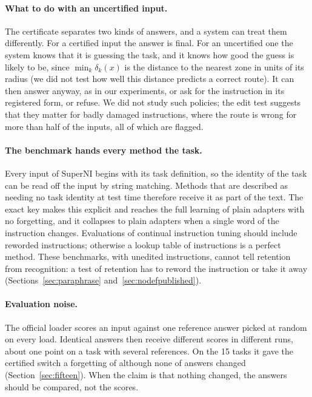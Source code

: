 \paragraph{What to do with an uncertified input.} The certificate separates two kinds of answers,
and a system can treat them differently. For a certified input the answer is final. For an
uncertified one the system knows that it is guessing the task, and it knows how good the guess is
likely to be, since $\min_k \delta_k(x)$ is the distance to the nearest zone in units of its radius (we did not test how well this distance predicts a correct route).
It can then answer anyway, as in our experiments, or ask for the instruction in its registered
form, or refuse. We did not study such policies; the edit test suggests that they matter for badly
damaged instructions, where the route is wrong for more than half of the inputs, all of which are
flagged.

\paragraph{The benchmark hands every method the task.} Every input of SuperNI begins with its task
definition, so the identity of the task can be read off the input by string matching. Methods that
are described as needing no task identity at test time therefore receive it as part of the text.
The exact key makes this explicit and reaches the full learning of plain adapters with no
forgetting, and it collapses to plain adapters when a single word of the instruction changes.
Evaluations of continual instruction tuning should include reworded instructions; otherwise a
lookup table of instructions is a perfect method. These benchmarks, with unedited instructions, cannot tell retention from recognition: a test of retention has to reword the instruction or take it away (Sections~\ref{sec:paraphrase} and~\ref{sec:nodefpublished}).

\paragraph{Evaluation noise.} The official loader scores an input against one reference answer
picked at random on every load. Identical answers then receive different scores in different
runs, about one point on a task with several references. On the 15 tasks it gave the certified switch a forgetting of \FifteenCertOffFT{} although none of
\FifteenCertCompared{} answers changed (Section~\ref{sec:fifteen}). When the claim is that nothing changed,
the answers should be compared, not the scores.
